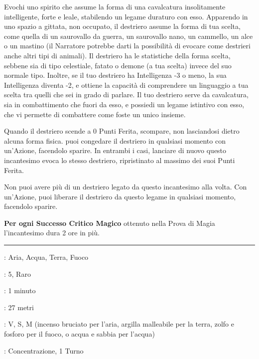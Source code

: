 \begin{multicols}{2}
Evochi uno spirito che assume la forma di una cavalcatura insolitamente intelligente, forte e leale, stabilendo un legame duraturo con esso. Apparendo in uno spazio a gittata, non occupato, il destriero assume la forma di tua scelta, come quella di un saurovallo da guerra, un saurovallo nano, un cammello, un alce o un mastino (il Narratore potrebbe darti la possibilità di evocare come destrieri anche altri tipi di animali). Il destriero ha le statistiche della forma scelta, sebbene sia di tipo celestiale, fatato o demone (a tua scelta) invece del suo normale tipo. Inoltre, se il tuo destriero ha Intelligenza -3 o meno, la sua Intelligenza diventa -2, e ottiene la capacità di comprendere un linguaggio a tua scelta tra quelli che sei in grado di parlare. Il tuo destriero serve da cavalcatura, sia in combattimento che fuori da esso, e possiedi un legame istintivo con esso, che vi permette di combattere come foste un unico insieme.

Quando il destriero scende a 0 Punti Ferita, scompare, non lasciandosi dietro alcuna forma fisica. puoi congedare il destriero in qualsiasi momento con un'Azione, facendolo sparire. In entrambi i casi, lanciare di nuovo questo incantesimo evoca lo stesso destriero, ripristinato al massimo dei suoi Punti Ferita.

Non puoi avere più di un destriero legato da questo incantesimo alla volta. Con un'Azione, puoi liberare il destriero da questo legame in qualsiasi momento, facendolo sparire.

\textbf{Per ogni Successo Critico Magico} ottenuto nella Prova di Magia l'incantesimo dura 2 ore in più.

\smallskip\noindent\rule{\linewidth}{2pt} \hypertarget{Evoca Elementale}{}\smallskip{}
\noindent
\begin{description}[noitemsep, topsep=0pt, parsep=0pt, partopsep=0pt, leftmargin=0cm, labelwidth=2.8cm]
	\item[\textbf{Lista di Magia}]: Aria, Acqua, Terra, Fuoco
	\item[\textbf{Livello}]: 5, Raro
	\item[\textbf{T. di Lancio}]: 1 minuto
	\item[\textbf{Gittata}]: 27 metri
	\item[\textbf{Componenti}]: V, S, M (incenso bruciato per l'aria, argilla malleabile per la terra, zolfo e fosforo per il fuoco, o acqua e sabbia per l'acqua)
	\item[\textbf{Durata}]: Concentrazione, 1 Turno
\end{description}


\end{multicols}

